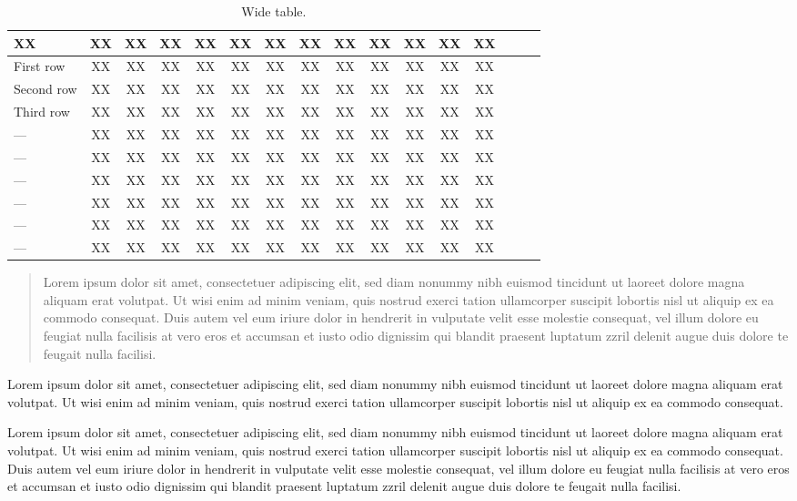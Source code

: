 \documentclass{dsj}
\begin{document}
\begin{table*}
\caption{\label{tab2}Wide table.}
\begin{tabular*}{\hsize}{lccccccccccccccc}
\hline
XX & XX & XX & XX & XX & XX & XX  & XX  & XX  & XX  & XX  & XX  & XX  \\
\hline
First row & XX &XX & XX & XX & XX & XX &XX & XX & XX& XX & XX & XX\\
Second row & XX &XX & XX & XX & XX & XX &XX & XX & XX& XX & XX & XX\\
Third row & XX &XX & XX & XX & XX & XX &XX & XX & XX& XX & XX & XX\\
--- & XX &XX & XX & XX & XX & XX &XX & XX & XX& XX & XX & XX\\
--- & XX &XX & XX & XX & XX & XX &XX & XX & XX& XX & XX & XX\\
--- & XX &XX & XX & XX & XX & XX &XX & XX & XX& XX & XX & XX\\
--- & XX &XX & XX & XX & XX & XX &XX & XX & XX& XX & XX & XX\\
--- & XX &XX & XX & XX & XX & XX &XX & XX & XX& XX & XX & XX\\
--- & XX &XX & XX & XX & XX & XX &XX & XX & XX& XX & XX & XX\\
\hline
\end{tabular*}
\end{table*}

\begin{quote}
Lorem ipsum dolor sit amet, consectetuer adipiscing elit, sed diam nonummy nibh euismod tincidunt ut laoreet dolore magna aliquam erat volutpat. Ut wisi enim ad minim veniam, quis nostrud exerci tation ullamcorper suscipit lobortis nisl ut aliquip ex ea commodo consequat. Duis autem vel eum iriure dolor in hendrerit in vulputate velit esse molestie consequat, vel illum dolore eu feugiat nulla facilisis at vero eros et accumsan et iusto odio dignissim qui blandit praesent luptatum zzril delenit augue duis dolore te feugait nulla facilisi.
\end{quote}

Lorem ipsum dolor sit amet, consectetuer adipiscing elit, sed diam nonummy nibh euismod tincidunt ut laoreet dolore magna aliquam erat volutpat. Ut wisi enim ad minim veniam, quis nostrud exerci tation ullamcorper suscipit lobortis nisl ut aliquip ex ea commodo consequat.

Lorem ipsum dolor sit amet, consectetuer adipiscing elit, sed diam nonummy nibh euismod tincidunt ut laoreet dolore magna aliquam erat volutpat. Ut wisi enim ad minim veniam, quis nostrud exerci tation ullamcorper suscipit lobortis nisl ut aliquip ex ea commodo consequat. Duis autem vel eum iriure dolor in hendrerit in vulputate velit esse molestie consequat, vel illum dolore eu feugiat nulla facilisis at vero eros et accumsan et iusto odio dignissim qui blandit praesent luptatum zzril delenit augue duis dolore te feugait nulla facilisi.
\end{document}
